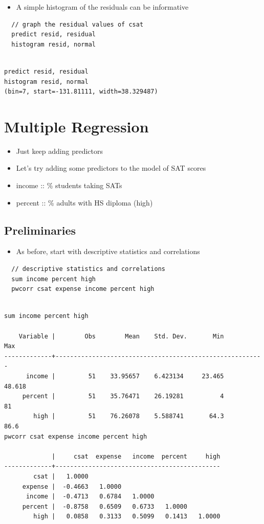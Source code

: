 \documentclass[]{book}
\providecommand{\tightlist}{%
  \setlength{\itemsep}{0pt}\setlength{\parskip}{0pt}}
\begin{document}
\begin{itemize}
\tightlist
\item
  A simple histogram of the residuals can be informative
\end{itemize}

\begin{verbatim}
  // graph the residual values of csat
  predict resid, residual
  histogram resid, normal 
\end{verbatim}

\begin{verbatim}

predict resid, residual
histogram resid, normal
(bin=7, start=-131.81111, width=38.329487)
\end{verbatim}

\section{Multiple Regression}\label{multiple-regression}

\begin{itemize}
\tightlist
\item
  Just keep adding predictors
\item
  Let's try adding some predictors to the model of SAT scores
\item
  income :: \% students taking SATs
\item
  percent :: \% adults with HS diploma (high)
\end{itemize}

\subsection{Preliminaries}\label{preliminaries-1}

\begin{itemize}
\tightlist
\item
  As before, start with descriptive statistics and correlations
\end{itemize}

\begin{verbatim}
  // descriptive statistics and correlations
  sum income percent high
  pwcorr csat expense income percent high
\end{verbatim}

\begin{verbatim}

sum income percent high

    Variable |        Obs        Mean    Std. Dev.       Min        Max
-------------+---------------------------------------------------------
      income |         51    33.95657    6.423134     23.465     48.618
     percent |         51    35.76471    26.19281          4         81
        high |         51    76.26078    5.588741       64.3       86.6
pwcorr csat expense income percent high

             |     csat  expense   income  percent     high
-------------+---------------------------------------------
        csat |   1.0000 
     expense |  -0.4663   1.0000 
      income |  -0.4713   0.6784   1.0000 
     percent |  -0.8758   0.6509   0.6733   1.0000 
        high |   0.0858   0.3133   0.5099   0.1413   1.0000
\end{verbatim}
\end{document}
